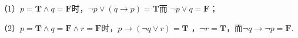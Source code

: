 \begin{solution}
    （1）$p=\textbf{T} \wedge q=\textbf{F}$时，$\neg p\vee (q\rightarrow p) =\textbf{T}$而
    $\neg p \vee q = \textbf{F}$；

    （2）$p=\textbf{T} \wedge q=\textbf{F} \wedge r=\textbf{F}$时，$p\rightarrow(\neg q \vee r) = \textbf{T}$
    ，$\neg r=\textbf{T}$，而$\neg q\rightarrow \neg p = \textbf{F}$.
\end{solution}